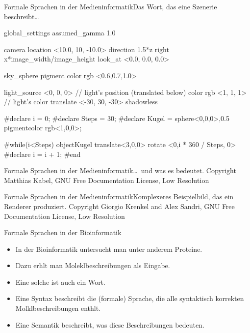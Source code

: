 \begin{frame}[fragile]{Formale Sprachen in der Medieninformatik}{Das
    Wort, das eine Szenerie beschreibt\dots}
\begin{verbatim*}
global_settings { assumed_gamma 1.0 }

camera {
  location  <10.0, 10, -10.0>
  direction 1.5*z
  right     x*image_width/image_height
  look_at   <0.0, 0.0,  0.0>
}

sky_sphere { pigment { color rgb <0.6,0.7,1.0> } }

light_source {
  <0, 0, 0>            // light's position (translated below)
  color rgb <1, 1, 1>  // light's color
  translate <-30, 30, -30>
  shadowless
}

#declare i = 0; 
#declare Steps = 30;
#declare Kugel = sphere{<0,0,0>,0.5 pigment{color rgb<1,0,0>}};

#while(i<Steps)
    object{Kugel  translate<3,0,0> rotate <0,i * 360 / Steps, 0> }
  #declare i = i + 1;
#end
\end{verbatim*}
\end{frame}


\begin{frame}{Formale Sprachen in der Medieninformatik}{\dots\ und was es bedeutet.}
  {Copyright Matthias Kabel, GNU Free Documentation License, Low Resolution}
\end{frame}

\begin{frame}{Formale Sprachen in der Medieninformatik}{Komplexeres Beispielbild, das ein Renderer produziert.}
  {Copyright Giorgio Krenkel and Alex Sandri, GNU Free Documentation License, Low Resolution}
\end{frame}


\begin{frame}{Formale Sprachen in der Bioinformatik}
  \begin{itemize}
  \item In der Bioinformatik untersucht man unter anderem Proteine.
  \item Dazu erhlt man \alert{Moleklbeschreibungen} als Eingabe.
  \item Eine solche ist auch ein \alert{Wort}.
  \item Eine \alert{Syntax} beschreibt die (formale) Sprache, die alle
    \alert{syntaktisch korrekten Molklbeschreibungen}  enthlt.
  \item Eine \alert{Semantik} beschreibt, was diese Beschreibungen bedeuten.
  \end{itemize}
\end{frame}


